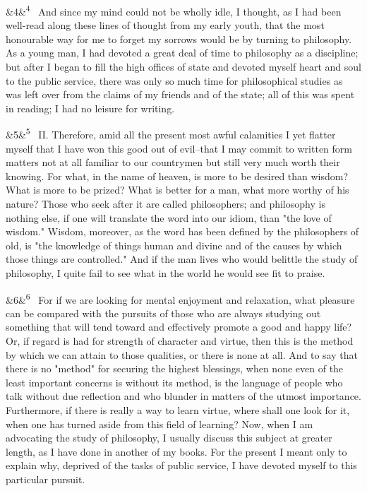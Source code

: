 \documentclass[12pt]{article}
\newcommand{\para}[1][]{\par\noindent\ifx&#1&\else\textsuperscript{\footnotesize #1}~\fi}
\begin{document}
\para[4] And since my mind could not be wholly idle, I thought, as I had been well-read along these lines of thought from my early youth, that the most honourable way for me to forget my sorrows would be by turning to philosophy. As a young man, I had devoted a great deal of time to philosophy as a discipline; but after I began to fill the high offices of state and devoted myself heart and soul to the public service, there was only so much time for philosophical studies as was left over from the claims of my friends and of the state; all of this was spent in reading; I had no leisure for writing.

\para[5] II. Therefore, amid all the present most awful calamities I yet flatter myself that I have won this good out of evil--that I may commit to written form matters not at all familiar to our countrymen but still very much worth their knowing. For what, in the name of heaven, is more to be desired than wisdom? What is more to be prized? What is better for a man, what more worthy of his nature? Those who seek after it are called philosophers; and philosophy is nothing else, if one will translate the word into our idiom, than "the love of wisdom." Wisdom, moreover, as the word has been defined by the philosophers of old, is "the knowledge of things human and divine and of the causes by which those things are controlled." And if the man lives who would belittle the study of philosophy, I quite fail to see what in the world he would see fit to praise.

\para[6] For if we are looking for mental enjoyment and relaxation, what pleasure can be compared with the pursuits of those who are always studying out something that will tend toward and effectively promote a good and happy life? Or, if regard is had for strength of character and virtue, then this is the method by which we can attain to those qualities, or there is none at all. And to say that there is no "method" for securing the highest blessings, when none even of the least important concerns is without its method, is the language of people who talk without due reflection and who blunder in matters of the utmost importance. Furthermore, if there is really a way to learn virtue, where shall one look for it, when one has turned aside from this field of learning? Now, when I am advocating the study of philosophy, I usually discuss this subject at greater length, as I have done in another of my books. For the present I meant only to explain why, deprived of the tasks of public service, I have devoted myself to this particular pursuit.
\end{document}
